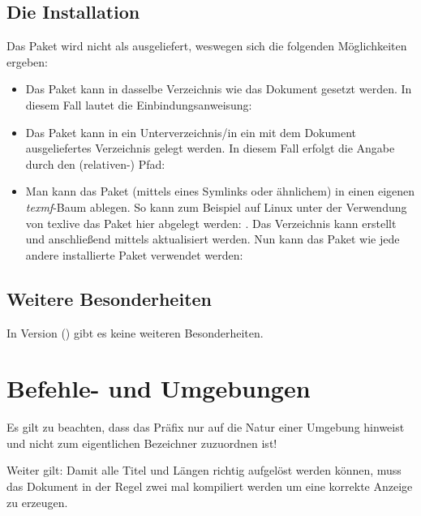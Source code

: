 \documentclass{sopra-base}
\begin{document}
\subsection{Die Installation}
    Das Paket wird nicht als  ausgeliefert, weswegen sich die
    folgenden Möglichkeiten ergeben:
    \begin{itemize}
        \item Das Paket kann in dasselbe Verzeichnis wie das Dokument
                gesetzt werden. In diesem Fall lautet die Einbindungsanweisung:
\begin{plainlatex}
\usepackage{sopra-ntts}
\end{plainlatex}
        \item Das Paket kann in ein Unterverzeichnis/in ein mit
                dem Dokument ausgeliefertes Verzeichnis gelegt werden. In
                diesem Fall erfolgt die Angabe durch den (relativen-) Pfad:
\begin{plainlatex}
\usepackage{./Mein/Pfad/zu/sopra-ntts}
\end{plainlatex}
        \item Man kann das Paket (mittels eines Symlinks oder ähnlichem)
              in einen eigenen \emph{texmf}-Baum ablegen.
              So kann zum Beispiel auf Linux unter der Verwendung von texlive
              das Paket hier abgelegt werden: .
              Das Verzeichnis kann erstellt und anschließend mittels
               aktualisiert werden. Nun kann
              das Paket wie jede andere installierte Paket verwendet werden:
\begin{plainlatex}
\usepackage{sopra-ntts}
\end{plainlatex}
    \end{itemize}

\subsection{Weitere Besonderheiten}
In Version \thesonversion{} () gibt es keine weiteren
Besonderheiten.

\section{Befehle- und Umgebungen}

Es gilt zu beachten, dass das Präfix  nur auf die Natur einer Umgebung hinweist und nicht zum eigentlichen Bezeichner zuzuordnen ist!\par{}
Weiter gilt: Damit alle Titel und Längen richtig aufgelöst werden können, muss das Dokument
in der Regel zwei mal kompiliert werden um eine korrekte Anzeige zu erzeugen.
\end{document}
